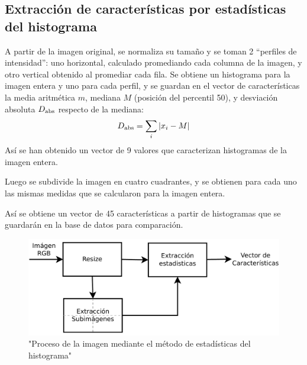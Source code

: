 \documentclass[conference,spanish,a4paper,10pt,oneside,final]{tfmpd}
\begin{document}
\subsection*{Extracción de características por estadísticas del histograma}
A partir de la imagen original, se normaliza su tamaño y se toman 2 ``perfiles de
intensidad'': uno horizontal, calculado promediando cada columna de la imagen, y
otro vertical obtenido al promediar cada fila. Se obtiene un histograma para la
imagen entera y uno para cada perfil, y se guardan en el vector de
características la media aritmética $m$, mediana $M$ (posición del percentil 50),
 y desviación absoluta $D_{\textrm{abs}}$ respecto de la mediana:
\begin{equation*}
D_{\textrm{abs}}=\sum_i |x_i - M|
\end{equation*}
Así se han obtenido un vector de 9 valores que caracterizan histogramas de la
imagen entera.

Luego se subdivide la imagen en cuatro cuadrantes, y se obtienen para cada uno
las mismas medidas que se calcularon para la imagen entera.

Así se obtiene un vector de 45 características a partir de histogramas que se
guardarán en la base de datos para comparación.

\begin{figure}
\begin{center}
\includegraphics[scale=0.25]{../diagramas/procesoestadisticas} 
\end{center}
\caption{"Proceso de la imagen mediante el método de estadísticas del histograma"}
\label{procesohough}
\end{figure}

%
%
\subsection*{}

%
%
%
%
\end{document}
